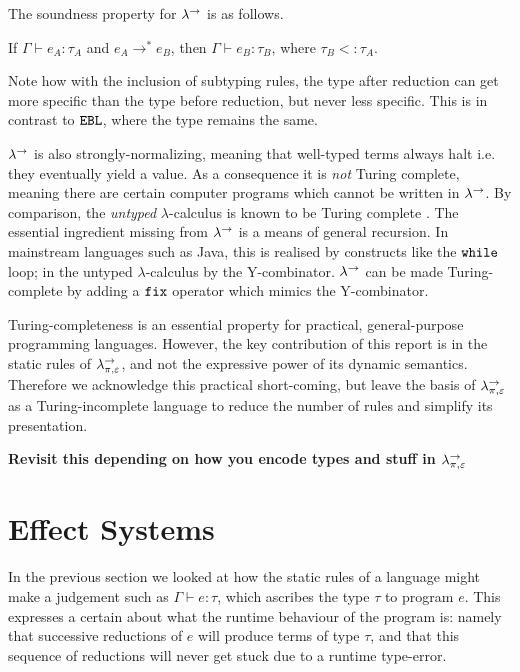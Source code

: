 The soundness property for $\lambda^{\rightarrow}$ is as follows.

\begin{theorem}
If $\Gamma \vdash e_A: \tau_A$ and $e_A \longrightarrow^* e_B$, then $\Gamma \vdash e_B: \tau_B$, where $\tau_B <: \tau_A$.
\end{theorem}

Note how with the inclusion of subtyping rules, the type after reduction can get more specific than the type before reduction, but never less specific. This is in contrast to $\mathtt{EBL}$, where the type remains the same.

$\lambda^{\rightarrow}$ is also strongly-normalizing, meaning that well-typed terms always halt i.e. they eventually yield a value. As a consequence it is \textit{not} Turing complete, meaning there are certain computer programs which cannot be written in $\lambda^{\rightarrow}$. By comparison, the \textit{untyped} $\lambda$-calculus is known to be Turing complete \cite{kleene43}. The essential ingredient missing from $\lambda^{\rightarrow}$ is a means of general recursion. In mainstream languages such as Java, this is realised by constructs like the $\mathtt{while}$ loop; in the untyped $\lambda$-calculus by the Y-combinator. $\lambda^{\rightarrow}$ can be made Turing-complete by adding a $\mathtt{fix}$ operator which mimics the Y-combinator.

Turing-completeness is an essential property for practical, general-purpose programming languages. However, the key contribution of this report is in the static rules of $\lambda^{\rightarrow}_{\pi, \varepsilon}$, and not the expressive power of its dynamic semantics. Therefore we acknowledge this practical short-coming, but leave the basis of $\lambda^{\rightarrow}_{\pi, \varepsilon}$ as a Turing-incomplete language to reduce the number of rules and simplify its presentation.

\textbf{Revisit this depending on how you encode types and stuff in $\lambda^{\rightarrow}_{\pi, \varepsilon}$}


\section{Effect Systems}

In the previous section we looked at how the static rules of a language might make a judgement such as $\Gamma \vdash e: \tau$, which ascribes the type $\tau$ to program $e$. This expresses a certain about what the runtime behaviour of the program is: namely that successive reductions of $e$ will produce terms of type $\tau$, and that this sequence of reductions will never get stuck due to a runtime type-error.

